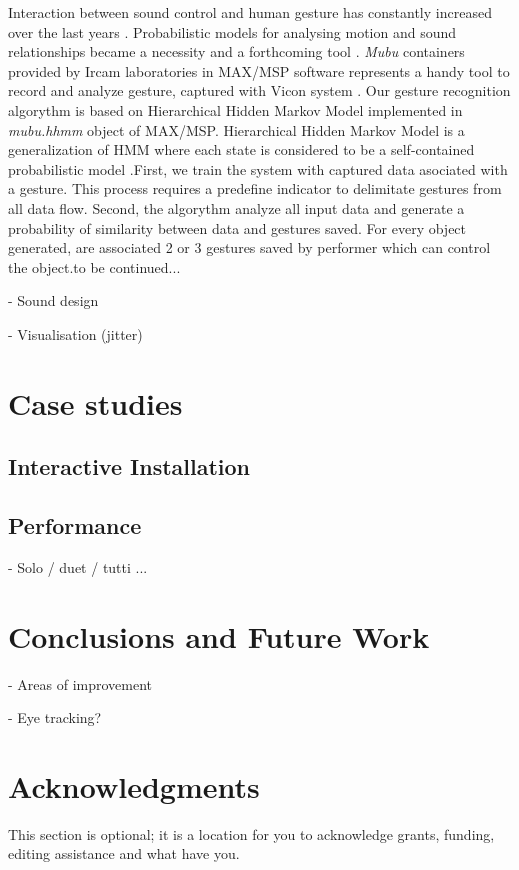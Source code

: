 \documentclass{nime-alternate}
\begin{document}
Interaction between sound control and human gesture has constantly increased over the last years \cite{Gestureanalysis}. Probabilistic models for analysing motion and sound relationships became a necessity and a forthcoming tool \cite{probabilisticmodels}. \textit{Mubu} containers provided by Ircam laboratories in MAX/MSP software represents a handy tool to record and analyze gesture, captured with Vicon system \cite{mubu}. Our gesture recognition algorythm is based on Hierarchical Hidden Markov Model implemented in \textit{mubu.hhmm} object of MAX/MSP. Hierarchical Hidden Markov Model is a generalization of HMM where each state is considered to be a self-contained probabilistic model \cite{hhmm}.First, we train the system with captured data asociated with a gesture. This process requires a predefine indicator to delimitate gestures from all data flow. Second, the algorythm analyze all input data and generate a probability of similarity between data and gestures saved. For every object generated, are associated 2 or 3 gestures saved by performer which can control the object.to be continued...

- Sound design

- Visualisation (jitter)

\section{Case studies}
\subsection{Interactive Installation}
\subsection{Performance}
- Solo / duet / tutti ...


\section{Conclusions and Future Work}
- Areas of improvement

- Eye tracking?

\section{Acknowledgments}
This section is optional; it is a location for you
to acknowledge grants, funding, editing assistance and
what have you. 

%

 

\end{document}

